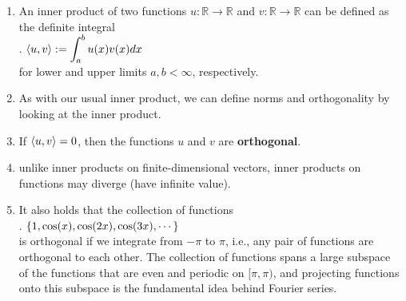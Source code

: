 \begin{enumerate}
    \item An inner product of two functions $u : \mathbb{R} \to \mathbb{R}$ and $v : \mathbb{R} \to \mathbb{R}$ can be defined as the definite integral
    \hfill \cite{mfml/book/mml/Deisenroth-Faisal-Ong}
    \\
    .\hfill
    $
        \langle u, v\rangle
        := \displaystyle\int^b_a u(x)v(x) dx
    $
    \hfill \cite{mfml/book/mml/Deisenroth-Faisal-Ong}
    \\
    for lower and upper limits $a, b < \infty$, respectively.
    \hfill \cite{mfml/book/mml/Deisenroth-Faisal-Ong}

    \item As with our usual inner product, we can define norms and orthogonality by looking at the inner product.
    \hfill \cite{mfml/book/mml/Deisenroth-Faisal-Ong}

    \item If $\langle u, v\rangle = 0$, then the functions $u$ and $v$ are \textbf{orthogonal}.
    \hfill \cite{mfml/book/mml/Deisenroth-Faisal-Ong}

    \item unlike inner products on finite-dimensional vectors, inner products on functions may diverge (have infinite value).
    \hfill \cite{mfml/book/mml/Deisenroth-Faisal-Ong}

    \item It also holds that the collection of functions
    \hfill \cite{mfml/book/mml/Deisenroth-Faisal-Ong}
    \\
    .\hfill
    $
        \left\{1, \cos(x), \cos(2x), \cos(3x), \cdots \right\}
    $
    \hfill \cite{mfml/book/mml/Deisenroth-Faisal-Ong}
    \\
    is orthogonal if we integrate from $-\pi$ to $\pi$, i.e., any pair of functions are orthogonal to each other.
    The collection of functions spans a large subspace of the functions that are even and periodic on $[\pi, \pi)$, and projecting functions onto this subspace is the fundamental idea behind Fourier series.
    \hfill \cite{mfml/book/mml/Deisenroth-Faisal-Ong}

    
\end{enumerate}

























